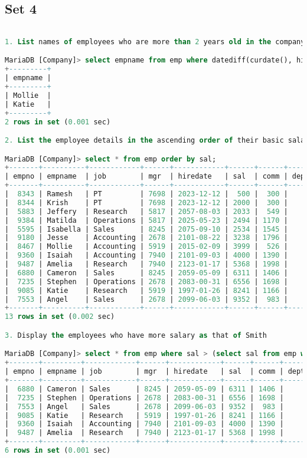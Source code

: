 \documentclass[11pt]{article}
\begin{document}
\subsection{Set 4}

\begin{lstlisting}[language=SQL]

1. List names of employees who are more than 2 years old in the company.

MariaDB [Company]> select empname from emp where datediff(curdate(), hiredate)/365 > 2;
+---------+
| empname |
+---------+
| Mollie  |
| Katie   |
+---------+
2 rows in set (0.001 sec)

2. List the employee details in the ascending order of their basic salary.

MariaDB [Company]> select * from emp order by sal;
+-------+----------+------------+------+------------+------+------+--------+
| empno | empname  | job        | mgr  | hiredate   | sal  | comm | deptno |
+-------+----------+------------+------+------------+------+------+--------+
|  8343 | Ramesh   | PT         | 7698 | 2023-12-12 |  500 |  300 |     60 |
|  8344 | Krish    | PT         | 7698 | 2023-12-12 | 2000 |  300 |     60 |
|  5883 | Jeffery  | Research   | 5817 | 2057-08-03 | 2033 |  549 |     20 |
|  9384 | Matilda  | Operations | 5817 | 2025-05-23 | 2494 | 1170 |     40 |
|  5595 | Isabella | Sales      | 8245 | 2075-09-10 | 2534 | 1545 |     30 |
|  9180 | Jesse    | Accounting | 2678 | 2101-08-22 | 3238 | 1796 |     10 |
|  8467 | Mollie   | Accounting | 5919 | 2015-02-09 | 3999 |  526 |     10 |
|  9360 | Isaiah   | Accounting | 7940 | 2101-09-03 | 4000 | 1390 |     10 |
|  9487 | Amelia   | Research   | 7940 | 2123-01-17 | 5368 | 1998 |     20 |
|  6880 | Cameron  | Sales      | 8245 | 2059-05-09 | 6311 | 1406 |     30 |
|  7235 | Stephen  | Operations | 2678 | 2083-00-31 | 6556 | 1698 |     40 |
|  9085 | Katie    | Research   | 5919 | 1997-01-26 | 8241 | 1166 |     20 |
|  7553 | Angel    | Sales      | 2678 | 2099-06-03 | 9352 |  983 |     30 |
+-------+----------+------------+------+------------+------+------+--------+
13 rows in set (0.002 sec)

3. Display the employees who have more salary as that of Smith

MariaDB [Company]> select * from emp where sal > (select sal from emp where empname = 'Mollie');
+-------+---------+------------+------+------------+------+------+--------+
| empno | empname | job        | mgr  | hiredate   | sal  | comm | deptno |
+-------+---------+------------+------+------------+------+------+--------+
|  6880 | Cameron | Sales      | 8245 | 2059-05-09 | 6311 | 1406 |     30 |
|  7235 | Stephen | Operations | 2678 | 2083-00-31 | 6556 | 1698 |     40 |
|  7553 | Angel   | Sales      | 2678 | 2099-06-03 | 9352 |  983 |     30 |
|  9085 | Katie   | Research   | 5919 | 1997-01-26 | 8241 | 1166 |     20 |
|  9360 | Isaiah  | Accounting | 7940 | 2101-09-03 | 4000 | 1390 |     10 |
|  9487 | Amelia  | Research   | 7940 | 2123-01-17 | 5368 | 1998 |     20 |
+-------+---------+------------+------+------------+------+------+--------+
6 rows in set (0.001 sec)


\end{lstlisting}
\end{document}
